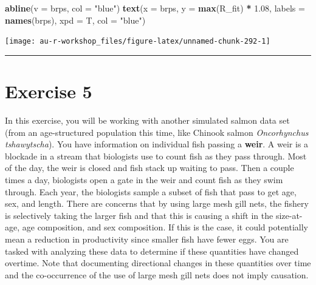 \documentclass[]{book}
\newenvironment{Shaded}{\begin{snugshade}}{\end{snugshade}}
\newcommand{\KeywordTok}[1]{\textcolor[rgb]{0.13,0.29,0.53}{\textbf{#1}}}
\newcommand{\DataTypeTok}[1]{\textcolor[rgb]{0.13,0.29,0.53}{#1}}
\newcommand{\FloatTok}[1]{\textcolor[rgb]{0.00,0.00,0.81}{#1}}
\newcommand{\StringTok}[1]{\textcolor[rgb]{0.31,0.60,0.02}{#1}}
\newcommand{\OperatorTok}[1]{\textcolor[rgb]{0.81,0.36,0.00}{\textbf{#1}}}
\newcommand{\NormalTok}[1]{#1}
\theoremstyle{definition}
\theoremstyle{definition}
\theoremstyle{definition}
\theoremstyle{remark}
\begin{document}
\begin{Shaded}
\begin{Highlighting}[]
\KeywordTok{abline}\NormalTok{(}\DataTypeTok{v =}\NormalTok{ brps, }\DataTypeTok{col =} \StringTok{"blue"}\NormalTok{)}
\KeywordTok{text}\NormalTok{(}\DataTypeTok{x =}\NormalTok{ brps, }\DataTypeTok{y =} \KeywordTok{max}\NormalTok{(R_fit) }\OperatorTok{*}\StringTok{ }\FloatTok{1.08}\NormalTok{, }
     \DataTypeTok{labels =} \KeywordTok{names}\NormalTok{(brps), }\DataTypeTok{xpd =}\NormalTok{ T, }\DataTypeTok{col =} \StringTok{"blue"}\NormalTok{)}
\end{Highlighting}
\end{Shaded}

\begin{center}\texttt{[image: au-r-workshop\_files/figure-latex/unnamed-chunk-292-1]} \end{center}

\begin{center}\rule{0.5\linewidth}{\linethickness}\end{center}

\section*{Exercise 5}\label{exercise-5}

In this exercise, you will be working with another simulated salmon data
set (from an age-structured population this time, like Chinook salmon
\emph{Oncorhynchus tshawytscha}). You have information on individual
fish passing a \textbf{weir}. A weir is a blockade in a stream that
biologists use to count fish as they pass through. Most of the day, the
weir is closed and fish stack up waiting to pass. Then a couple times a
day, biologists open a gate in the weir and count fish as they swim
through. Each year, the biologists sample a subset of fish that pass to
get age, sex, and length. There are concerns that by using large mesh
gill nets, the fishery is selectively taking the larger fish and that
this is causing a shift in the size-at-age, age composition, and sex
composition. If this is the case, it could potentially mean a reduction
in productivity since smaller fish have fewer eggs. You are tasked with
analyzing these data to determine if these quantities have changed
overtime. Note that documenting directional changes in these quantities
over time and the co-occurrence of the use of large mesh gill nets does
not imply causation.
\end{document}
